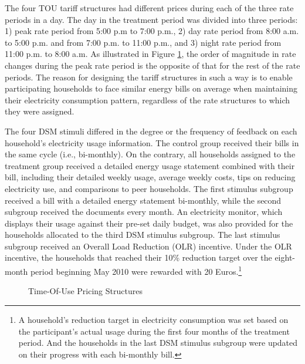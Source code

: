 The four TOU tariff structures had different prices during each of the three rate periods in a day. The day in the treatment period was divided into three periods: 1) peak rate period from 5:00 p.m to 7:00 p.m., 2) day rate period from 8:00 a.m. to 5:00 p.m. and from 7:00 p.m. to 11:00 p.m., and 3) night rate period from 11:00 p.m. to 8:00 a.m. As illustrated in Figure \ref{Figure:Time-Of-Use-Pricing-Structures}, the order of magnitude in rate changes during the peak rate period is the opposite of that for the rest of the rate periods. The reason for designing the tariff structures in such a way is to enable participating households to face similar energy bills on average when maintaining their electricity consumption pattern, regardless of the rate structures to which they were assigned. 

The four DSM stimuli differed in the degree or the frequency of feedback on each household's electricity usage information. The control group received their bills in the same cycle (i.e., bi-monthly). On the contrary, all households assigned to the treatment group received a detailed energy usage statement combined with their bill, including their detailed weekly usage, average weekly costs, tips on reducing electricity use, and comparisons to peer households. The first stimulus subgroup received a bill with a detailed energy statement bi-monthly, while the second subgroup received the documents every month. An electricity monitor, which displays their usage against their pre-set daily budget, was also provided for the households allocated to the third DSM stimulus subgroup. The last stimulus subgroup received an Overall Load Reduction (OLR) incentive. Under the OLR incentive, the households that reached their 10\% reduction target over the eight-month period beginning May 2010 were rewarded with 20 Euros.\footnote{A household's reduction target in electricity consumption was set based on the participant's actual usage during the first four months of the treatment period. And the households in the last DSM stimulus subgroup were updated on their progress with each bi-monthly bill.}

\begin{figure}[!th]
\caption{Time-Of-Use Pricing Structures}
\label{Figure:Time-Of-Use-Pricing-Structures}
\end{figure}
